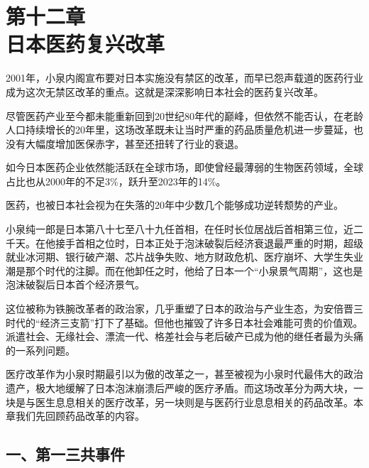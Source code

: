 

\section[第十二章\q 日本医药复兴改革]{第十二章\\ 日本医药复兴改革}


{\fangsong 2001年，小泉内阁宣布要对日本实施没有禁区的改革，而早已怨声载道的医药行业成为这次无禁区改革的重点。这就是深深影响日本社会的医药复兴改革。\par}

{\fangsong 尽管医药产业至今都未能重新回到20世纪80年代的巅峰，但依然不能否认，在老龄人口持续增长的20年里，这场改革既未让当时严重的药品质量危机进一步蔓延，也没有大幅度增加医保赤字，甚至还扭转了行业的衰退。\par}

{\fangsong 如今日本医药企业依然能活跃在全球市场，即使曾经最薄弱的生物医药领域，全球占比也从2000年的不足3\%，跃升至2023年的14\%。\par}

{\fangsong 医药，也被日本社会视为在失落的20年中少数几个能够成功逆转颓势的产业。\par}

小泉纯一郎是日本第八十七至八十九任首相，在任时长位居战后首相第三位，近二千天。在他接手首相之位时，日本正处于泡沫破裂后经济衰退最严重的时期，超级就业冰河期、银行破产潮、芯片战争失败、地方财政危机、医疗崩坏、大学生失业潮是那个时代的注脚。而在他卸任之时，他给了日本一个“小泉景气周期”，这也是泡沫破裂后日本首个经济景气。

这位被称为铁腕改革者的政治家，几乎重塑了日本的政治与产业生态，为安倍晋三时代的“经济三支箭”打下了基础。但他也摧毁了许多日本社会难能可贵的价值观。派遣社会、无缘社会、漂流一代、格差社会与老后破产已成为他的继任者最为头痛的一系列问题。

医疗改革作为小泉时期最引以为傲的改革之一，甚至被视为小泉时代最伟大的政治遗产，极大地缓解了日本泡沫崩溃后严峻的医疗矛盾。而这场改革分为两大块，一块是与医生息息相关的医疗改革，另一块则是与医药行业息息相关的药品改革。本章我们先回顾药品改革的内容。

\subsection{一、第一三共事件}


